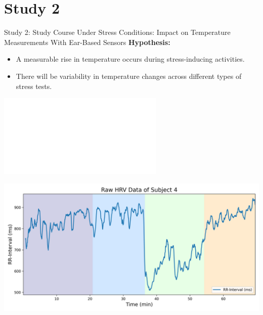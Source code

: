 \documentclass[en]{sdqbeamer}
\begin{document}

\section{Study 2}
\begin{frame}{Study 2: Study Course Under Stress Conditions: Impact on Temperature Measurements With Ear-Based Sensors}
\textbf{Hypothesis:}
\begin{overprint}
  \begin{itemize}
    \item<1-> A measurable rise in temperature occurs during stress-inducing activities.
    \item<2-> There will be variability in temperature changes across different types of stress tests.
  \end{itemize}
\end{overprint}

\begin{center}
  \includegraphics<1->[width=0.95\linewidth]{../thesis-doc/images/study2/Procedure2_short.pdf} %
\end{center}
\end{frame}

\begin{frame}
    \begin{center}
        \includegraphics[width=0.9\linewidth]{../thesis-doc/images/study2/p04/raw_hrv_data_participant_4.png} 
    \end{center}
\end{frame}
\end{document}
